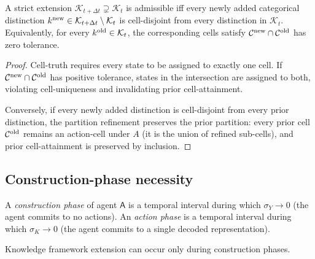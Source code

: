 \documentclass[11pt,twocolumn,a4paper]{article}
\newcommand{\K}{\mathcal{K}}
\newcommand{\Cell}{\mathcal{C}}
\newcommand{\agent}{\mathsf{A}}
\begin{document}
\begin{theorem}\label{thm:t1}
A strict extension $\K_{t+\Delta t} \supsetneq \K_t$ is admissible iff every newly added
categorical distinction $k^{\rm new} \in \K_{t+\Delta t} \setminus \K_t$ is cell-disjoint
from every distinction in $\K_t$. Equivalently, for every $k^{\rm old} \in \K_t$, the
corresponding cells satisfy $\Cell^{\rm new} \cap \Cell^{\rm old}$ has zero tolerance.
\end{theorem}

\begin{proof}
Cell-truth requires every state to be assigned to exactly one cell. If
$\Cell^{\rm new} \cap \Cell^{\rm old}$ has positive tolerance, states in the
intersection are assigned to both, violating cell-uniqueness and invalidating prior
cell-attainment.

Conversely, if every newly added distinction is cell-disjoint from every prior
distinction, the partition refinement preserves the prior partition: every prior cell
$\Cell^{\rm old}$ remains an action-cell under $A$ (it is the union of refined sub-cells),
and prior cell-attainment is preserved by inclusion.
\end{proof}

\subsection{Construction-phase necessity}

\begin{definition}\label{def:phases}
A \emph{construction phase} of agent $\agent$ is a temporal interval during which
$\sigma_Y \to 0$ (the agent commits to no actions). An \emph{action phase} is a temporal
interval during which $\sigma_K \to 0$ (the agent commits to a single decoded
representation).
\end{definition}

\begin{theorem}\label{thm:t2}
Knowledge framework extension can occur only during construction phases.
\end{theorem}
\end{document}
